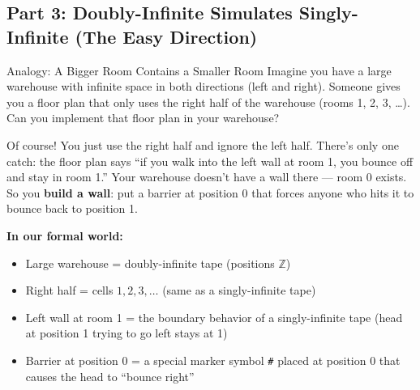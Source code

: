\subsection{Part 3: Doubly-Infinite Simulates Singly-Infinite (The Easy Direction)}
\label{subsec:doubly-simulates-singly}

\begin{notebox}{Analogy: A Bigger Room Contains a Smaller Room}
Imagine you have a large warehouse with infinite space in both directions
(left and right). Someone gives you a floor plan that only uses the right
half of the warehouse (rooms 1, 2, 3, \ldots). Can you implement that floor
plan in your warehouse?

Of course! You just use the right half and ignore the left half. There's only
one catch: the floor plan says ``if you walk into the left wall at room 1,
you bounce off and stay in room 1.'' Your warehouse doesn't have a wall
there --- room 0 exists. So you \textbf{build a wall}: put a barrier at
position 0 that forces anyone who hits it to bounce back to position 1.

\textbf{In our formal world:}
\begin{itemize}[nosep]
\item Large warehouse = doubly-infinite tape (positions $\mathbb{Z}$)
\item Right half = cells $1, 2, 3, \ldots$ (same as a singly-infinite tape)
\item Left wall at room 1 = the boundary behavior of a singly-infinite tape
  (head at position 1 trying to go left stays at 1)
\item Barrier at position 0 = a special marker symbol \texttt{\#} placed at
  position 0 that causes the head to ``bounce right''
\end{itemize}
\end{notebox}


